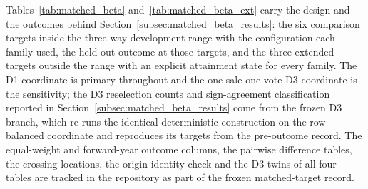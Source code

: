 \documentclass[10pt]{article}
\theoremstyle{definition}
\newcommand{\1}{\mathbf{1}}
\begin{document}
Tables~\ref{tab:matched_beta} and~\ref{tab:matched_beta_ext} carry the design and the
outcomes behind Section~\ref{subsec:matched_beta_results}: the six comparison targets inside the
three-way development range with the configuration each family used, the held-out outcome at those
targets, and the three extended targets outside the range with an explicit attainment state for
every family. The D1 coordinate is primary throughout and the one-sale-one-vote D3 coordinate is the
sensitivity; the D3 reselection counts and sign-agreement classification reported in
Section~\ref{subsec:matched_beta_results} come from the frozen D3 branch, which re-runs the
identical deterministic construction on the row-balanced coordinate and reproduces its targets from
the pre-outcome record. The equal-weight and forward-year outcome columns, the pairwise difference
tables, the crossing locations, the origin-identity check and the D3 twins of all four tables are
tracked in the repository as part of the frozen matched-target record.
\end{document}

